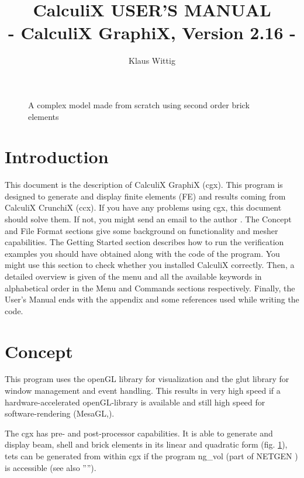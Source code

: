 \documentclass{article}
\begin{document}
\title{CalculiX USER'S MANUAL\\ - CalculiX GraphiX, Version 2.16 -}
\author{Klaus Wittig}
\maketitle
\begin{figure}[h]
\caption{\label{cover} A complex model made from scratch using second order brick elements }
\end{figure}
\newpage


\tableofcontents


\section{Introduction}
 This document is the description of CalculiX GraphiX (cgx). This program is designed to generate and display finite elements (FE) and results coming from CalculiX CrunchiX (ccx). If you have any problems using cgx, this document should solve them. If not, you might send an email to the author \cite{cgx}. The Concept and File Format sections give some background on functionality and mesher capabilities. The Getting Started section describes how to run the verification examples you should have obtained along with the code of the program. You might use this section to check whether you installed CalculiX correctly. Then, a detailed overview is given of the menu and all the available keywords in alphabetical order in the Menu and Commands sections respectively. Finally, the User's Manual ends with the appendix and some references used while writing the code.


\section{Concept}
This program uses the openGL library for visualization and the glut library \cite{glut} for window management and event handling. This results in very high speed if a hardware-accelerated openGL-library is available and still high speed for software-rendering (MesaGL,\cite{mesa}). 

The cgx has pre- and post-processor capabilities. It is able to generate and display beam, shell and brick elements in its linear and quadratic form (fig. \ref{cover}), tets can be generated from within cgx if the program ng\_vol (part of NETGEN \cite{NETGEN}) is accessible (see also '''').
\end{document}
